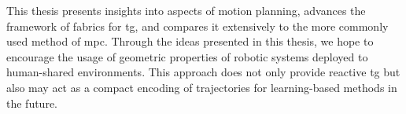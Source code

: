 This thesis presents insights into aspects of motion planning, advances the
framework of \ac{fabrics} for \ac{tg}, and compares it extensively to the more
commonly used method of \ac{mpc}. Through the ideas presented in this thesis, we
hope to encourage the usage of geometric properties of robotic systems deployed
to human-shared environments. This approach does not only provide reactive
\ac{tg} but also may act as a compact encoding of trajectories for
learning-based methods in the future.











